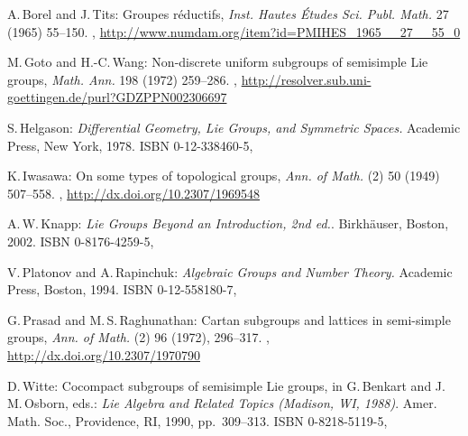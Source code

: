 \begin{references}{9}

A.\,Borel and J.\,Tits:
Groupes r\'eductifs,
\emph{Inst. Hautes \'Etudes Sci. Publ. Math.} 27 (1965) 55--150.
,
\maynewline
\url{http://www.numdam.org/item?id=PMIHES_1965__27__55_0}

M.\,Goto and H.-C.\,Wang:
Non-discrete uniform subgroups of semisimple Lie groups,
\emph{Math. Ann.} 198 (1972) 259--286.
,
\maynewline
\url{http://resolver.sub.uni-goettingen.de/purl?GDZPPN002306697}

S.\,Helgason:
\emph{Differential Geometry, Lie Groups, and Symmetric Spaces.}
Academic Press, New York, 1978.
ISBN 0-12-338460-5,

K.\,Iwasawa:
On some types of topological groups,
\emph{Ann. of Math.} (2) 50 (1949) 507--558. 
,
\maynewline
\url{http://dx.doi.org/10.2307/1969548}

A.\,W.\,Knapp:
\emph{Lie Groups Beyond an Introduction, 2nd ed.}. 
Birkhäuser, Boston, 2002. 
ISBN 0-8176-4259-5,

 V.\,Platonov and A.\,Rapinchuk: 
 \emph{Algebraic Groups and Number Theory.}
 Academic Press, Boston, 1994.
 ISBN 0-12-558180-7,
 
G.\,Prasad and M.\,S.\,Raghunathan:
Cartan subgroups and lattices in semi-simple groups,
\emph{Ann. of Math.} (2) 96 (1972), 296--317. 
,
\url{http://dx.doi.org/10.2307/1970790}

D.\,Witte:
Cocompact subgroups of semisimple Lie groups,
in 
G.\,Benkart and J.\,M.\,Osborn, eds.:
\emph{Lie Algebra and Related Topics (Madison, WI, 1988)}.
Amer. Math. Soc., Providence, RI, 1990, pp.~309--313. 
ISBN 0-8218-5119-5,


 \end{references}
